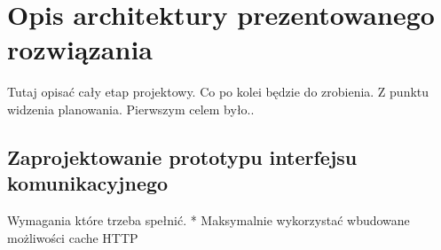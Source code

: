 \chapter{Opis architektury prezentowanego rozwiązania}
Tutaj opisać cały etap projektowy. Co po kolei będzie do zrobienia.
Z punktu widzenia planowania.
Pierwszym celem było..

\section{Zaprojektowanie prototypu interfejsu komunikacyjnego}
Wymagania które trzeba spełnić.
* Maksymalnie wykorzystać wbudowane możliwości cache HTTP